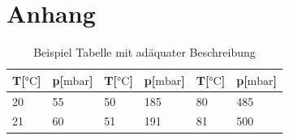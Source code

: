\documentclass[12pt]{article}
\begin{document}
\section{Anhang}
\begin{table}[H]
  \centering
  \caption{Beispiel Tabelle mit adäquater Beschreibung}\label{tab:1}
  \begin{tabular}{ll|ll|ll}
      \textbf{T}[$\si{\degreeCelsius}$] & \textbf{p}[$\si{\milli\bar}$] & \textbf{T}[$\si{\degreeCelsius}$] & \textbf{p}[$\si{\milli\bar}$] & \textbf{T}[$\si{\degreeCelsius}$] & \textbf{p}[$\si{\milli\bar}$] \\ \hline
      20 & 55  & 50 & 185 & 80 & 485 \\
      21 & 60  & 51 & 191 & 81 & 500 \\
      \hline
  \end{tabular}
\end{table}
\end{document}

